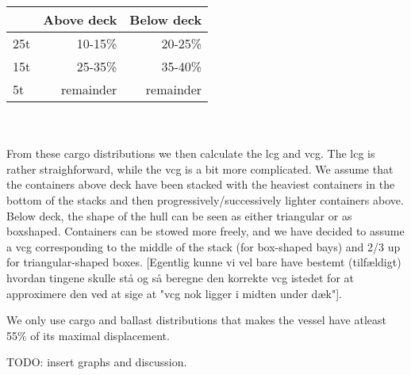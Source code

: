 \begin{tabular}{l|rr}
		&	Above deck &	Below deck\\ 
		\hline
25t	&		10-15\%	 &	20-25\%	\\	
15t	&		25-35\%	 &	35-40\% \\
5t	&	remainder  &	remainder\\
\end{tabular}
\\\\
From these cargo distributions we then calculate the lcg and vcg. The lcg is rather straighforward, while the vcg is a bit more complicated. We assume that the containers above deck have been stacked with the heaviest containers in the bottom of the stacks and then progressively/successively lighter containers above. Below deck, the shape of the hull can be seen as either triangular or as boxshaped. Containers can be stowed more freely, and we have decided to assume a vcg corresponding to the middle of the stack (for box-shaped bays) and 2/3 up for triangular-shaped boxes. [Egentlig kunne vi vel bare have bestemt (tilfældigt) hvordan tingene skulle stå og så beregne den korrekte vcg istedet for at approximere den ved at sige at "vcg nok ligger i midten under dæk"].  

We only use cargo and ballast distributions that makes the vessel have atleast 55\% of its maximal displacement. 

TODO: insert graphs and discussion.

